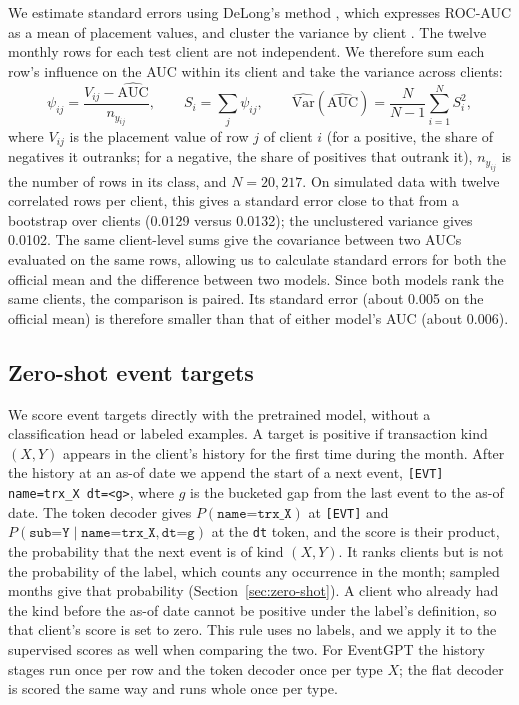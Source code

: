 \documentclass[12pt]{article}
\newcommand{\tok}[1]{\texttt{#1}}
\begin{document}
We estimate standard errors using DeLong's method \cite{delong}, which expresses ROC-AUC as a mean of placement values, and cluster the variance by client \cite{obuchowski}. The twelve monthly rows for each test client are not independent. We therefore sum each row's influence on the AUC within its client and take the variance across clients:
\begin{equation}
\label{eq:clustered-auc}
\psi_{ij} = \frac{V_{ij} - \widehat{\mathrm{AUC}}}{n_{y_{ij}}},
\qquad
S_i = \sum_{j} \psi_{ij},
\qquad
\widehat{\mathrm{Var}}(\widehat{\mathrm{AUC}}) = \frac{N}{N-1} \sum_{i=1}^{N} S_i^2,
\end{equation}
where $V_{ij}$ is the placement value of row $j$ of client $i$ (for a positive, the share of negatives it outranks; for a negative, the share of positives that outrank it), $n_{y_{ij}}$ is the number of rows in its class, and $N = 20{,}217$.
On simulated data with twelve correlated rows per client, this gives a standard error close to that from a bootstrap over clients (0.0129 versus 0.0132); the unclustered variance gives 0.0102. The same client-level sums give the covariance between two AUCs evaluated on the same rows, allowing us to calculate standard errors for both the official mean and the difference between two models. Since both models rank the same clients, the comparison is paired. Its standard error (about 0.005 on the official mean) is therefore smaller than that of either model's AUC (about 0.006).

\subsection{Zero-shot event targets}\label{sec:zs-protocol}

We score event targets directly with the pretrained model, without a classification head or labeled examples. A target is positive if transaction kind $(X,Y)$ appears in the client's history for the first time during the month. After the history at an as-of date we append the start of a next event, \tok{[EVT] name=trx\_X dt=<g>}, where $g$ is the bucketed gap from the last event to the as-of date. The token decoder gives $P(\tok{name=trx\_X})$ at \tok{[EVT]} and $P(\tok{sub=Y} \mid \tok{name=trx\_X}, \tok{dt=g})$ at the \tok{dt} token, and the score is their product, the probability that the next event is of kind $(X, Y)$. It ranks clients but is not the probability of the label, which counts any occurrence in the month; sampled months give that probability (Section~\ref{sec:zero-shot}). A client who already had the kind before the as-of date cannot be positive under the label's definition, so that client's score is set to zero. This rule uses no labels, and we apply it to the supervised scores as well when comparing the two. For EventGPT the history stages run once per row and the token decoder once per type $X$; the flat decoder is scored the same way and runs whole once per type.
\end{document}
